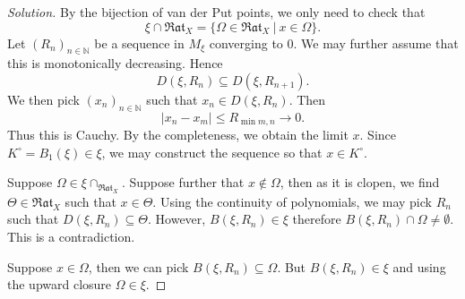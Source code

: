 \documentclass[8pt]{article}
\numberwithin{equation}{section}
\newenvironment{solution}{\begin{proof}[Solution]}{\end{proof}}
\newcommand{\N}[0]{\mathbb{N}}
\newcommand{\sep}[0]{\:|\:}
\newcommand{\ab}[1]{\vert #1 \vert}
\newcommand{\Rat}[0]{\mathfrak{Rat}}
\begin{document}
\begin{solution}
  By the bijection of van der Put points, we only need to check that 
  \begin{equation*}
    \xi\cap\Rat_X = \{\Omega\in\Rat_X\sep x\in \Omega\}.
  \end{equation*}
  Let $(R_n)_{n\in\N}$ be a sequence in $M_\xi$ converging to $0$. We may further assume that this is monotonically decreasing. Hence
  \begin{equation*}
    D(\xi,R_n)\subseteq D(\xi,R_{n+1}).
  \end{equation*}
  We then pick $(x_n)_{n\in\N}$ such that $x_n\in D(\xi,R_n)$. Then 
  \begin{equation*}
    \ab{x_n-x_m} \leq R_{\min{m,n}}\to0.
  \end{equation*}
  Thus this is Cauchy. By the completeness, we obtain the limit $x$. Since $K^\circ =B_1(\xi)\in\xi$, we may construct the sequence so that $x\in K^\circ$.
  \par Suppose $\Omega\in\xi\cap_{\Rat_X}$. Suppose further that $x\not\in \Omega$, then as it is clopen, we find $\Theta\in\Rat_X$ such that $x\in\Theta$. Using the continuity of polynomials, we may pick $R_n$ such that $D(\xi,R_n)\subseteq\Theta$.
  However, $B(\xi,R_n)\in\xi$ therefore $B(\xi,R_n)\cap \Omega\not=\emptyset$. This is a contradiction.
  \par Suppose $x\in\Omega$, then we can pick $B(\xi,R_n)\subseteq\Omega$. But $B(\xi,R_n)\in\xi$ and using the upward closure $\Omega\in\xi$.
\end{solution}
\end{document}
